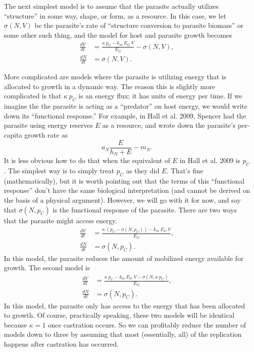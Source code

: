 \documentclass[11pt,reqno,final,pdftex]{amsart}\usepackage[]{graphicx}\usepackage[]{color}
\theoremstyle{plain}
\numberwithin{equation}{part}
\begin{document}
The next simplest model is to assume that the parasite actually utilizes ``structure'' in some way, shape, or form, as a resource.
In this case, we let $\sigma(N,V)$ be the parasite's rate of ``structure conversion to parasite biomass'' or some other such thing, and the model for host and parasite growth becomes
\begin{align}
\frac{dV}{dt} &= \frac{\kappa~p_C - k_m~E_G~V }{E_G} - \sigma(N,V), \\
\frac{dN}{dt} &= \sigma(N,V).
\end{align}

More complicated are models where the parasite is utilizing energy that is allocated to growth in a dynamic way.
The reason this is slightly more complicated is that $\kappa~p_C$ is an energy flux; it has units of energy per time.
If we imagine the the parasite is acting as a ``predator'' on host energy, we would write down its ``functional response.''
For example, in Hall et al. 2009, Spencer had the parasite using energy reserves $E$ as a resource, and wrote down the parasite's per-capita growth rate as
\begin{equation}
a_N \frac{E}{h_N+E}-m_N.
\end{equation}
It is less obvious how to do that when the equivalent of $E$ in Hall et al. 2009 is $p_C$.
The simplest way is to simply treat $p_C$ as they did $E$.
That's fine (mathematically), but it is worth pointing out that the terms of this ``functional response'' don't have the same biological interpretation (and cannot be derived on the basis of a physical argument).
However, we will go with it for now, and say that $\sigma(N,p_C)$ is the functional response of the parasite.
There are two ways that the parasite might access energy.
\begin{align}
\frac{dV}{dt} &= \frac{\kappa~(p_C - \sigma(N,p_C)) - k_m~E_G~V}{E_G}, \\
\frac{dN}{dt} &= \sigma(N,p_C).
\end{align}
In this model, the parasite reduces the amount of mobilized energy available for growth.
The second model is
\begin{align}
\frac{dV}{dt} &= \frac{\kappa~p_C - k_m~E_G~V - \sigma(N,\kappa~p_C)}{E_G}, \\
\frac{dN}{dt} &= \sigma(N,p_C).
\end{align}
In this model, the parasite only has access to the energy that has been allocated to growth.
Of course, practically speaking, these two models will be identical because $\kappa=1$ once castration occurs.
So we can profitably reduce the number of models down to three by assuming that most (essentially, all) of the replication happens after castration has occurred.
\end{document}
